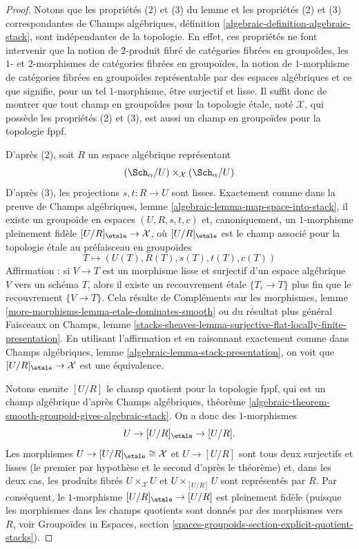 \begin{proof}
Notons que les propriétés (2) et (3) du lemme et les propriétés
(2) et (3) correspondantes de
Champs algébriques, définition \ref{algebraic-definition-algebraic-stack},
sont indépendantes de la topologie. En effet, ces propriétés
ne font intervenir que la notion de $2$-produit fibré de catégories fibrées en
groupoïdes, les $1$- et $2$-morphismes de catégories fibrées en groupoïdes, la
notion de $1$-morphisme de catégories fibrées en groupoïdes représentable
par des espaces algébriques et ce que signifie, pour un tel $1$-morphisme, être
surjectif et lisse.
Il suffit donc de montrer que tout champ en groupoïdes pour la topologie étale,
noté $\mathcal{X}$, qui possède les propriétés (2) et (3), est aussi un champ en groupoïdes pour la topologie fppf.

\medskip\noindent
D'après (2), soit $R$ un espace algébrique représentant
$$
(\Sch_\alpha/U) \times_\mathcal{X} (\Sch_\alpha/U)
$$
D'après (3), les projections $s, t : R \to U$ sont lisses. Exactement comme dans la preuve de
Champs algébriques, lemme \ref{algebraic-lemma-map-space-into-stack},
il existe un groupoïde en espaces $(U, R, s, t, c)$ et, canoniquement,
un $1$-morphisme pleinement fidèle $[U/R]_\etale \to \mathcal{X}$,
où $[U/R]_\etale$ est le champ associé pour la topologie étale au préfaisceau
en groupoïdes
$$
T \longmapsto (U(T), R(T), s(T), t(T), c(T))
$$
Affirmation : si $V \to T$ est un morphisme lisse et surjectif d'un espace algébrique
$V$ vers un schéma $T$, alors il existe un recouvrement étale $\{T_i \to T\}$
plus fin que le recouvrement $\{V \to T\}$. Cela résulte de
Compléments sur les morphismes, lemme \ref{more-morphisms-lemma-etale-dominates-smooth}
ou du résultat plus général
Faisceaux on Champs, lemme
\ref{stacks-sheaves-lemma-surjective-flat-locally-finite-presentation}.
En utilisant l'affirmation et en raisonnant exactement comme dans
Champs algébriques, lemme \ref{algebraic-lemma-stack-presentation},
on voit que $[U/R]_\etale \to \mathcal{X}$ est une
équivalence.

\medskip\noindent
Notons ensuite $[U/R]$ le champ quotient pour la topologie fppf,
qui est un champ algébrique d'après
Champs algébriques, théorème
\ref{algebraic-theorem-smooth-groupoid-gives-algebraic-stack}.
On a donc des $1$-morphismes
$$
U \to [U/R]_\etale \to [U/R].
$$
Les morphismes $U \to [U/R]_\etale \cong \mathcal{X}$ et
$U \to [U/R]$ sont tous deux surjectifs et lisses (le premier par hypothèse
et le second d'après le théorème) et, dans les deux cas, les
produits fibrés $U \times_\mathcal{X} U$ et $U \times_{[U/R]} U$
sont représentés par $R$. Par conséquent, le $1$-morphisme
$[U/R]_\etale \to [U/R]$ est pleinement fidèle (puisque les morphismes
dans les champs quotients sont donnés par des morphismes vers $R$, voir
Groupoïdes in Espaces, section
\ref{spaces-groupoids-section-explicit-quotient-stacks}).


\end{proof}
